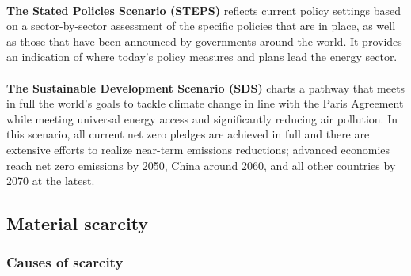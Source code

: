 \documentclass[../summary.tex]{subfiles}
\begin{document}
\\
\textbf{The Stated Policies Scenario (STEPS) }reflects current policy settings based on a sector-by-sector assessment of the specific policies that are in place, as well as those that have been announced by governments around the world. It provides an indication of where today’s policy measures and plans lead the energy sector.\\
\\
\textbf{The Sustainable Development Scenario (SDS) }charts a pathway that meets in full the world’s goals to tackle climate change in line with the Paris Agreement while meeting universal energy access and significantly reducing air pollution. In this scenario, all current net zero pledges are achieved in full and there are extensive efforts to realize near-term emissions reductions; advanced economies reach net zero emissions by 2050, China around 2060, and all other countries by 2070 at the latest.
\newpage
\subsection{Material scarcity}
\subsubsection{Causes of scarcity}
\end{document}
